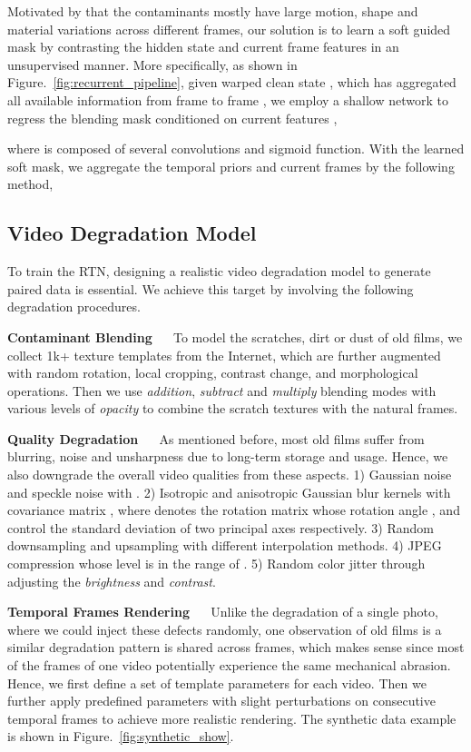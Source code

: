 \documentclass[10pt,twocolumn,letterpaper]{article}
\begin{document}
	Motivated by that the contaminants mostly have large motion, shape and material variations across different frames, our solution is to learn a soft guided mask by contrasting the hidden state and current frame features in an unsupervised manner. More specifically, as shown in Figure.~\ref{fig:recurrent_pipeline}, given warped clean state , which has aggregated all available information from frame  to frame , we employ a shallow network  to regress the blending mask  conditioned on current features ,
	\vspace{-0.5em}
	
	where  is composed of several convolutions and sigmoid function. With the learned soft mask, we aggregate the temporal priors and current frames by the following method,
	\vspace{-0.5em}
	
	
	\subsection{Video Degradation Model}\label{sec3.2}
	
	
	To train the RTN, designing a realistic video degradation model to generate paired data is essential. We achieve this target by involving the following degradation procedures.
	
	\noindent\textbf{Contaminant Blending} ~~ To model the scratches, dirt or dust of old films, we collect 1k+ texture templates from the Internet, which are further augmented with random rotation, local cropping, contrast change, and morphological operations. Then we use \textit{addition}, \textit{subtract} and \textit{multiply} blending modes with various levels of \textit{opacity} to combine the scratch textures with the natural frames.
	
	\noindent\textbf{Quality Degradation} ~~ As mentioned before, most old films suffer from blurring, noise and unsharpness due to long-term storage and usage. Hence, we also downgrade the overall video qualities from these aspects. 1)  Gaussian noise and speckle noise with . 2) Isotropic and anisotropic Gaussian blur kernels with covariance matrix , where  denotes the rotation matrix whose rotation angle , and  control the  standard deviation of two principal axes respectively.  3) Random downsampling and upsampling with different interpolation methods. 4) JPEG compression whose
	level is in the range of . 5) Random color jitter through adjusting the \textit{brightness} and \textit{contrast}.
	
	\noindent\textbf{Temporal Frames Rendering} ~~ Unlike the degradation of a single photo, where we could inject these defects randomly, one observation of old films is a similar degradation pattern is shared across frames, which makes sense since most of the frames of one video potentially experience the same mechanical abrasion. Hence, we first define a set of template parameters for each video. Then we further apply predefined parameters with slight perturbations on consecutive temporal frames to achieve more realistic rendering. The synthetic data example is shown in Figure.~\ref{fig:synthetic_show}.
	
\end{document}
